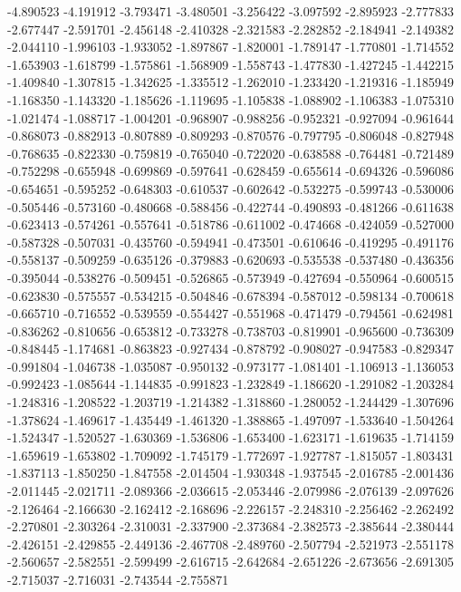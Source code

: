 -4.890523
-4.191912
-3.793471
-3.480501
-3.256422
-3.097592
-2.895923
-2.777833
-2.677447
-2.591701
-2.456148
-2.410328
-2.321583
-2.282852
-2.184941
-2.149382
-2.044110
-1.996103
-1.933052
-1.897867
-1.820001
-1.789147
-1.770801
-1.714552
-1.653903
-1.618799
-1.575861
-1.568909
-1.558743
-1.477830
-1.427245
-1.442215
-1.409840
-1.307815
-1.342625
-1.335512
-1.262010
-1.233420
-1.219316
-1.185949
-1.168350
-1.143320
-1.185626
-1.119695
-1.105838
-1.088902
-1.106383
-1.075310
-1.021474
-1.088717
-1.004201
-0.968907
-0.988256
-0.952321
-0.927094
-0.961644
-0.868073
-0.882913
-0.807889
-0.809293
-0.870576
-0.797795
-0.806048
-0.827948
-0.768635
-0.822330
-0.759819
-0.765040
-0.722020
-0.638588
-0.764481
-0.721489
-0.752298
-0.655948
-0.699869
-0.597641
-0.628459
-0.655614
-0.694326
-0.596086
-0.654651
-0.595252
-0.648303
-0.610537
-0.602642
-0.532275
-0.599743
-0.530006
-0.505446
-0.573160
-0.480668
-0.588456
-0.422744
-0.490893
-0.481266
-0.611638
-0.623413
-0.574261
-0.557641
-0.518786
-0.611002
-0.474668
-0.424059
-0.527000
-0.587328
-0.507031
-0.435760
-0.594941
-0.473501
-0.610646
-0.419295
-0.491176
-0.558137
-0.509259
-0.635126
-0.379883
-0.620693
-0.535538
-0.537480
-0.436356
-0.395044
-0.538276
-0.509451
-0.526865
-0.573949
-0.427694
-0.550964
-0.600515
-0.623830
-0.575557
-0.534215
-0.504846
-0.678394
-0.587012
-0.598134
-0.700618
-0.665710
-0.716552
-0.539559
-0.554427
-0.551968
-0.471479
-0.794561
-0.624981
-0.836262
-0.810656
-0.653812
-0.733278
-0.738703
-0.819901
-0.965600
-0.736309
-0.848445
-1.174681
-0.863823
-0.927434
-0.878792
-0.908027
-0.947583
-0.829347
-0.991804
-1.046738
-1.035087
-0.950132
-0.973177
-1.081401
-1.106913
-1.136053
-0.992423
-1.085644
-1.144835
-0.991823
-1.232849
-1.186620
-1.291082
-1.203284
-1.248316
-1.208522
-1.203719
-1.214382
-1.318860
-1.280052
-1.244429
-1.307696
-1.378624
-1.469617
-1.435449
-1.461320
-1.388865
-1.497097
-1.533640
-1.504264
-1.524347
-1.520527
-1.630369
-1.536806
-1.653400
-1.623171
-1.619635
-1.714159
-1.659619
-1.653802
-1.709092
-1.745179
-1.772697
-1.927787
-1.815057
-1.803431
-1.837113
-1.850250
-1.847558
-2.014504
-1.930348
-1.937545
-2.016785
-2.001436
-2.011445
-2.021711
-2.089366
-2.036615
-2.053446
-2.079986
-2.076139
-2.097626
-2.126464
-2.166630
-2.162412
-2.168696
-2.226157
-2.248310
-2.256462
-2.262492
-2.270801
-2.303264
-2.310031
-2.337900
-2.373684
-2.382573
-2.385644
-2.380444
-2.426151
-2.429855
-2.449136
-2.467708
-2.489760
-2.507794
-2.521973
-2.551178
-2.560657
-2.582551
-2.599499
-2.616715
-2.642684
-2.651226
-2.673656
-2.691305
-2.715037
-2.716031
-2.743544
-2.755871
